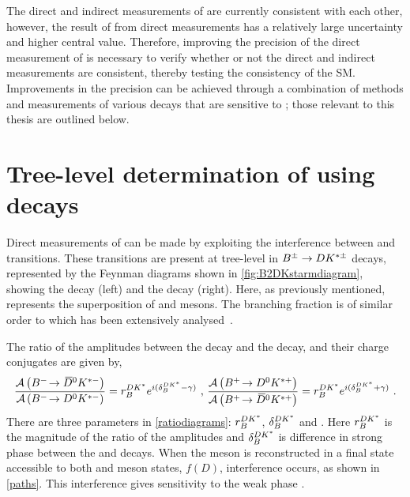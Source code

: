 The direct and indirect measurements of \Pgamma are currently consistent with each other, however, the result of \Pgamma from direct measurements has a relatively large uncertainty and higher central value. Therefore, improving the precision of the direct measurement of \Pgamma is necessary to verify whether or not the direct and indirect measurements are consistent, thereby testing the consistency of the SM. Improvements in the precision can be achieved through a combination of methods and measurements of various \B decays that are sensitive to \Pgamma; those relevant to this thesis are outlined below.

\section{Tree-level determination of \Pgamma using  decays}
\label{sec:theory:gamma}

Direct measurements of \Pgamma can be made by exploiting the interference between \decay{\bquark}{\cquark\uquarkbar\squark} and \decay{\bquark}{\uquark\cquarkbar\squark} transitions. These transitions are present at tree-level in ${{B}^\pm} \rightarrow {\ensuremath{D}}{\ensuremath{K}}^{*\pm}$ decays, represented by the Feynman diagrams shown in \fig\ref{fig:B2DKstarmdiagram}, showing the \decay{\Bm}{\Dz\Kstarm} decay (left) and the \decay{\Bm}{\Dzb\Kstarm} decay (right). Here, as previously mentioned, \D represents the superposition of \Dz and \Dzb mesons. The branching
fraction is of similar order to \decay{\Bm}{\Dzb\Km} which has been extensively analysed~\cite{LHCb-PAPER-2016-003,LHCb-PAPER-2014-041,LHCb-PAPER-2015-014}.


The ratio of the amplitudes between the \decay{\Bm}{\Dzb\Kstarm} decay and the \decay{\Bm}{\Dz\Kstarm} decay, and their charge conjugates are given by,
\begin{equation}
\frac{\mathcal{A}\left({{{B}^-}}\!\rightarrow {\ensuremath{{\kern 0.2em\overline{\kern -0.2em D}{}}{}^0}}{\ensuremath{{K}^{*-}}}\right)}{\mathcal{A}\left({{{B}^-}}\!\rightarrow {\ensuremath{{D}^0}}{\ensuremath{{K}^{*-}}}\right)} = r_B^{DK^*} e^{i(\delta_B^{DK^*} - \gamma)} \text{ , }
\frac{\mathcal{A}\left({{{B}^+}}\!\rightarrow {\ensuremath{{D}^0}}{\ensuremath{{K}^{*+}}}\right)}{\mathcal{A}\left({{{B}^+}}\!\rightarrow {\ensuremath{{\kern 0.2em\overline{\kern -0.2em D}{}}{}^0}}{\ensuremath{{K}^{*+}}}\right)} = r_B^{DK^*} e^{i(\delta_B^{DK^*} + \gamma)} \text{ .}
\label{ratiodiagrams}
\end{equation}
There are three parameters in \eqn\ref{ratiodiagrams}: $r_B^{DK^*}$, $\delta_B^{DK^*}$ and \Pgamma. Here $r_B^{DK^*}$ is the magnitude of the ratio of the amplitudes and $\delta_B^{DK^*}$ is difference in strong phase between the \decay{\Bm}{\Dz\Kstarm} and \decay{\Bm}{\Dzb\Kstarm} decays. When the \D meson is reconstructed in a final state accessible to both \Dz and \Dzb meson states, $f(D)$, interference occurs, as shown in \fig\ref{paths}. This interference gives sensitivity to the weak phase \Pgamma.

